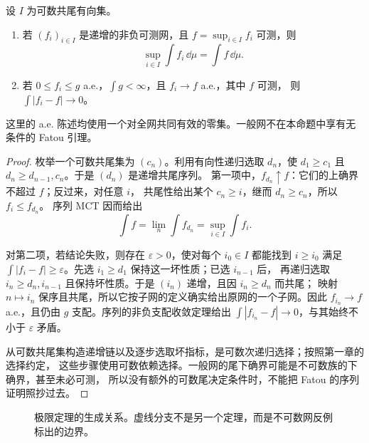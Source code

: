 \begin{proposition}[可数共尾网版本]\label{proposition:3-1-2-4}
设 $I$ 为可数共尾有向集。
\begin{enumerate}
 \item 若 $(f_i)_{i\in I}$ 是递增的非负可测网，且 $f=\sup_{i\in I}f_i$ 可测，则
 \[
   \sup_{i\in I}\int f_i\,\dd\mu=\int f\,\dd\mu.
 \]
 \item 若 $0\leq f_i\leq g$ a.e.，$\int g<\infty$，且 $f_i\to f$ a.e.，其中 $f$ 可测，
 则 $\int|f_i-f|\to0$。
\end{enumerate}
这里的 a.e. 陈述均使用一个对全网共同有效的零集。一般网不在本命题中享有无条件的 Fatou 引理。
\end{proposition}

\begin{proof}
枚举一个可数共尾集为 $(c_n)$。利用有向性递归选取 $d_n$，使
$d_1\geq c_1$ 且 $d_n\geq d_{n-1},c_n$。于是 $(d_n)$ 是递增共尾序列。
第一项中，$f_{d_n}\uparrow f$：它们的上确界不超过 $f$；反过来，对任意 $i$，
共尾性给出某个 $c_n\geq i$，继而 $d_n\geq c_n$，所以 $f_i\leq f_{d_n}$。
序列 MCT 因而给出
\[
 \int f=\lim_n\int f_{d_n}=\sup_{i\in I}\int f_i.
\]

对第二项，若结论失败，则存在 $\varepsilon>0$，使对每个 $i_0\in I$ 都能找到
$i\geq i_0$ 满足 $\int|f_i-f|\geq\varepsilon$。先选 $i_1\ge d_1$ 保持这一坏性质；已选 $i_{n-1}$ 后，
再递归选取 $i_n\geq d_n,i_{n-1}$ 且保持坏性质。于是 $(i_n)$ 递增，且因 $i_n\ge d_n$ 而共尾；
映射 $n\mapsto i_n$ 保序且共尾，所以它按子网的定义确实给出原网的一个子网。因此
$f_{i_n}\to f$ a.e.，且仍由 $g$ 支配。序列的非负支配收敛定理给出
$\int|f_{i_n}-f|\to0$，与其始终不小于 $\varepsilon$ 矛盾。

从可数共尾集构造递增链以及逐步选取坏指标，是可数次递归选择；按照第一章的选择约定，
这些步骤使用可数依赖选择。一般网的尾下确界可能是不可数族的下确界，甚至未必可测，
所以没有额外的可数尾决定条件时，不能把 Fatou 的序列证明照抄过去。
\end{proof}

\begin{figure}[htbp]
\centering
{}
\caption{极限定理的生成关系。虚线分支不是另一个定理，而是不可数网反例标出的边界。}
\label{fig:3-1-convergence-tree}
\end{figure}


